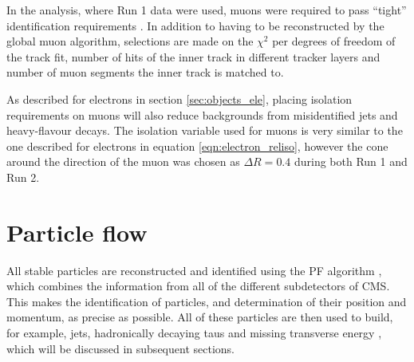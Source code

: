 In the \Htohhtobbtautau analysis, where Run 1 data 
were used, muons were required to pass ``tight'' identification requirements \cite{cms-muon-reco}. 
In addition to having to be reconstructed by the global muon algorithm, selections
are made on the $\chi^2$ per degrees of freedom of the track fit, number of hits of the inner
track in different tracker layers and number of muon segments the inner track is matched to.

As described for electrons in section \ref{sec:objects_ele}, placing isolation 
requirements on muons will also reduce backgrounds from misidentified jets and heavy-flavour
decays. The isolation variable used for muons is very similar to the one described for
electrons in equation \ref{eqn:electron_reliso}, however the cone around the direction of the
muon was chosen as $\Delta R = 0.4$ during both Run 1 and Run 2.

\section{Particle flow}
\label{sec:objects_pf}
All stable particles are reconstructed and identified using the \ac{PF} algorithm \cite{cms-pf-2009,cms-pf-2010-commfirst,cms-pf-2010-2}, which
combines the information from all of the different subdetectors of \ac{CMS}. This makes
the identification of particles, and determination of their position and momentum, as precise
as possible. All of these particles are then used to build, for example, jets, hadronically decaying taus and missing transverse
energy \MET, which will be discussed in subsequent sections.


